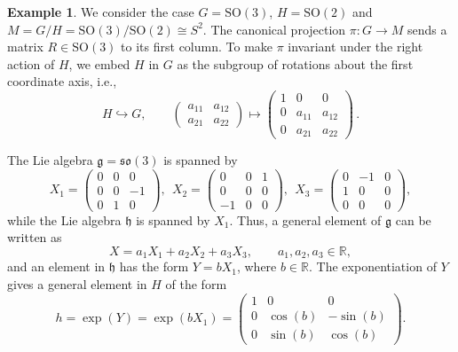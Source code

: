 \documentclass[12pt,a4paper]{article}
\numberwithin{equation}{section}
\newcommand{\SO}{\mathrm{SO}}
\newcommand{\R}{\mathbb{R}}
\theoremstyle{plain}
\theoremstyle{definition}
\newtheorem{example}[theorem]{Example}
\theoremstyle{remark}
\begin{document}
\begin{example}\label{ex:wang_SO3}
We consider the case $G=\SO(3)$, $H=\SO(2)$ and $M=G/H=\SO(3)/\SO(2)\cong S^2$. The canonical projection $\pi:G\to M$ sends a matrix $R\in \SO(3)$ to its first column. To make $\pi$ invariant under the right action of $H$, we embed $H$ in $G$ as the subgroup of rotations about the first coordinate axis, i.e.,
\begin{equation}
    H \hookrightarrow G, \qquad
    \begin{pmatrix}
    a_{11} & a_{12} \\
    a_{21} & a_{22}
    \end{pmatrix} \mapsto
    \begin{pmatrix}
    1 & 0 & 0 \\
    0 & a_{11} & a_{12} \\
    0 & a_{21} & a_{22}
    \end{pmatrix}\,.
\end{equation}

The Lie algebra $\mathfrak{g}=\mathfrak{so}(3)$ is spanned by
\begin{equation}
    X_1 = \begin{pmatrix}
    0 & 0 & 0 \\
    0 & 0 & -1 \\
    0 & 1 & 0
    \end{pmatrix}, \ \
    X_2 = \begin{pmatrix}
    0 & 0 & 1 \\
    0 & 0 & 0 \\
    -1 & 0 & 0
    \end{pmatrix}, \ \
    X_3 = \begin{pmatrix}
    0 & -1 & 0 \\
    1 & 0 & 0 \\
    0 & 0 & 0
    \end{pmatrix},
\end{equation}
while the Lie algebra $\mathfrak{h}$ is spanned by $X_1$. Thus, a general element of $\mathfrak{g}$ can be written as
\begin{equation}
    X=a_1X_1+a_2X_2+a_3X_3, \qquad a_1,a_2,a_3\in\R,
\end{equation}
and an element in $\mathfrak{h}$ has the form $Y = bX_1$, where $b\in\R$. The exponentiation of $Y$ gives a general element in $H$ of the form
\begin{equation}
    h = \exp(Y) = \exp(bX_1)=
    \begin{pmatrix}
        1 & 0 & 0 \\
        0 & \cos(b) & -\sin(b) \\
        0 & \sin(b) & \cos(b)
    \end{pmatrix}.
\end{equation}


\end{example}
\end{document}
